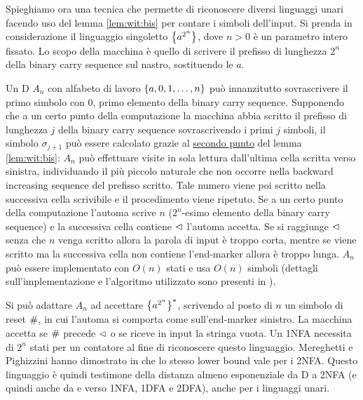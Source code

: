 Spieghiamo ora una tecnica che permette di riconoscere diversi linguaggi unari facendo uso del lemma \ref{lem:wit:bis} per contare i simboli dell'input. Si prenda in considerazione il linguaggio singoletto $\left\{ a^{2^n} \right\}$, dove $n>0$ è un parametro intero fissato. Lo scopo della macchina è quello di scrivere il prefisso di lunghezza $2^n$ della binary carry sequence sul nastro, sostituendo le $a$.

Un D $A_n$ con alfabeto di lavoro $\left\{ a,0,1,\dots,n \right\}$ può innanzitutto sovrascrivere il primo simbolo con $0$, primo elemento della binary carry sequence. Supponendo che a un certo punto della computazione la macchina abbia scritto il prefisso di lunghezza $j$ della binary carry sequence sovrascrivendo i primi $j$ simboli, il simbolo $\sigma_{j+1}$ può essere calcolato grazie al \hyperref[lem:wit:bis:2]{secondo punto} del lemma \ref{lem:wit:bis}: $A_n$ può effettuare visite in sola lettura dall'ultima cella scritta verso sinistra, individuando il più piccolo naturale che non occorre nella backward increasing sequence del prefisso scritto. Tale numero viene poi scritto nella successiva cella scrivibile e il procedimento viene ripetuto. Se a un certo punto della computazione l'automa scrive $n$ ($2^n$-esimo elemento della binary carry sequence) e la successiva cella contiene $\lhd$ l'automa accetta. Se si raggiunge $\lhd$ senza che $n$ venga scritto allora la parola di input è troppo corta, mentre se viene scritto ma la successiva cella non contiene l'end-marker allora è troppo lunga. $A_n$ può essere implementato con $O(n)$ stati e usa $O(n)$ simboli (dettagli sull'implementazione e l'algoritmo utilizzato sono presenti in \cite{Pighizzini:19:limitedunary}).

Si può adattare $A_n$ ad accettare $\left\{ a^{2^n} \right\}^*$, scrivendo al posto di $n$ un simbolo di reset $\#$, in cui l'automa si comporta come sull'end-marker sinistro. La macchina accetta se $\#$ precede $\lhd$ o se riceve in input la stringa vuota. Un 1NFA necessita di $2^n$ stati per un contatore al fine di riconoscere questo linguaggio. Mereghetti e Pighizzini hanno dimostrato in \cite{Mereghetti:00:twoway} che lo stesso lower bound vale per i 2NFA. Questo linguaggio è quindi testimone della distanza almeno esponenziale da D a 2NFA (e quindi anche da  e verso 1NFA, 1DFA e 2DFA), anche per i linguaggi unari.

